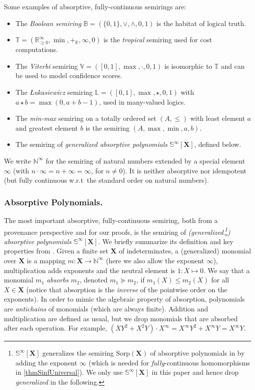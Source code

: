 \documentclass[english,runningheads,a4paper,envcountsame]{llncs}
\newcommand{\Bool}{\mathbb{B}}
\newcommand{\Ninf}{{\mathbb N}^{\infty}}
\newcommand{\Sorp}{\mathrm{Sorp}}
\newcommand{\Sinf}{{\mathbb S}^{\infty}}
\newcommand{\Trop}{\mathbb{T}}
\newcommand{\Vit}{\mathbb{V}}
\newcommand{\Luk}{\mathbb{L}}
\newcommand{\RR}{\mathbb{R}}
\newcommand*{\XX}{{\bm X}}
\newcommand*{\absorbs}{\succeq}
\newcommand*{\co}{\colon}
\newcommand{\Rplus}{+_\RR}
\begin{document}
Some examples of absorptive, fully-continuous semirings are:
\begin{itemize}
\item The \emph{Boolean semiring} $\Bool=(\{0,1\},\vee,\wedge,0,1)$ is the habitat of
logical truth.
\item $\Trop=(\mathbb{R}_{\ge0}^{\infty},\min,\Rplus,\infty,0)$
is the \emph{tropical} semiring used for cost computations.
\item The \emph{Viterbi} semiring $\Vit=([0,1],\max,\cdot,0,1)$
is isomorphic to $\Trop$ and can be used to model confidence scores.
\item The \emph{\L ukasiewicz} semiring $\Luk = ([0,1], \max, \star, 0, 1)$ with $a \star b = \max(0, a+b-1)$, used in many-valued logics.
\item The \emph{min-max} semiring on a totally ordered set $(A,\leq)$
with least element $a$ and greatest element $b$
is the semiring $(A,\max,\min,a,b)$.
\item The semiring of \emph{generalized absorptive polynomials} $\Sinf[\XX]$, defined below.
\end{itemize}

We write $\Ninf$ for the semiring of natural numbers extended by a special element $\infty$ (with $n \cdot \infty = n + \infty = \infty$, for $n \neq 0$).
It is neither absorptive nor idempotent (but fully continuous w.r.t\ the standard order on natural numbers).



\subsubsection*{Absorptive Polynomials.}

The most important absorptive, fully-continuous semiring, both from a provenance perspective and for our proofs, is the semiring of \emph{(generalized\,\footnote{$\Sinf[\XX]$ generalizes the semiring $\Sorp(\XX)$ of absorptive polynomials in \cite{DeutchMilRoyTan14} by adding the exponent $\infty$ (which is needed for \emph{fully}-continuous homomorphisms in \cref{thmSinfUniversal}). We only use $\Sinf[\XX]$ in this paper and hence drop \emph{generalized} in the following.}\!) absorptive polynomials} $\Sinf[\XX]$.
We briefly summarize its definition and key properties from \cite{DannertGraNaaTan21}.
Given a finite set $\XX$ of indeterminates, a (generalized) monomial over $\XX$ is a mapping $m \co \XX \to \Ninf$ (here we also allow the exponent $\infty$),
multiplication adds exponents and the neutral element is $1 \colon X  \mapsto 0$.
We say that a monomial $m_1$ \emph{absorbs} $m_2$, denoted $m_1 \absorbs m_2$, if $m_1(X) \le m_2(X)$ for all $X \in \XX$ (notice that absorption is the \emph{inverse} of the pointwise order on the exponents).
In order to mimic the algebraic property of absorption, polynomials are \emph{antichains} of monomials (which are always finite). Addition and multiplication are defined as usual, but we drop monomials that are absorbed after each operation.
For example, $(XY^2 + X^2Y) \cdot X^\infty = X^\infty Y^2 + X^\infty Y = X^\infty Y$.
\end{document}
